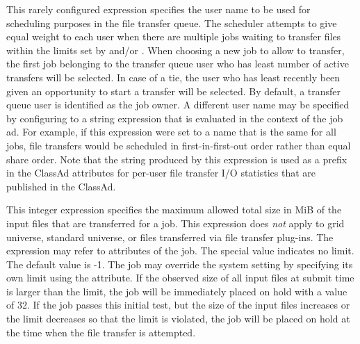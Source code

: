 \begin{description}
\label{param:TransferQueueUserExpr}
\item[\Macro{TRANSFER\_QUEUE\_USER\_EXPR}]
  This rarely configured expression specifies the user name to be used
  for scheduling purposes in the file transfer queue.  The scheduler
  attempts to give equal weight to each user when there are multiple
  jobs waiting to transfer files within the limits set by
   and/or
  .  When choosing a new job to
  allow to transfer, the first job belonging to the transfer queue
  user who has least number of active transfers will be selected.
  In case of a tie, the user who has least recently been given an
  opportunity to start a transfer will be selected.  By default, a
  transfer queue user is identified as the job owner.  A different
  user name may be specified by configuring
   to a string expression that is
  evaluated in the context of the job ad.  For example, if this
  expression were set to a name that is the same for all jobs, file
  transfers would be scheduled in first-in-first-out order rather than
  equal share order.  Note that the string produced by this expression
  is used as a prefix in the ClassAd attributes for per-user file
  transfer I/O statistics that are published in the 
  ClassAd.

\label{param:MaxTransferInputMB}
\item[\Macro{MAX\_TRANSFER\_INPUT\_MB}]
  This integer expression specifies the maximum allowed total size in
  MiB of the input files that are transferred for a job.  This
  expression does \emph{not} apply to grid universe, standard universe, or
  files transferred via file transfer plug-ins.  The expression may
  refer to attributes of the job.  
  The special value  indicates no limit.
  The default value is -1.
  The job may override the system setting
  by specifying its own limit using the 
  attribute.  
  If the observed size of all input files at submit time
  is larger than the limit, the job will be immediately placed on hold
  with a  value of 32.
  If the job passes this initial test, but the
  size of the input files increases or the limit decreases so that the
  limit is violated, the job will be placed on hold at the time when
  the file transfer is attempted.


\end{description}

